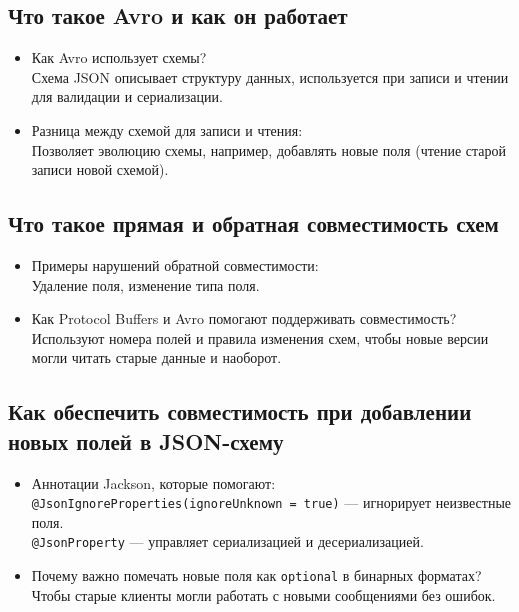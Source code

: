 \documentclass[a4paper,14pt]{article}
\begin{document}
\subsection{Что такое Avro и как он работает}

\begin{itemize}
\item Как Avro использует схемы? \\
Схема JSON описывает структуру данных, используется при записи и чтении для валидации и сериализации.

\item Разница между схемой для записи и чтения: \\
Позволяет эволюцию схемы, например, добавлять новые поля (чтение старой записи новой схемой).
\end{itemize}

\subsection{Что такое прямая и обратная совместимость схем}

\begin{itemize}
\item Примеры нарушений обратной совместимости: \\
Удаление поля, изменение типа поля.

\item Как Protocol Buffers и Avro помогают поддерживать совместимость? \\
Используют номера полей и правила изменения схем, чтобы новые версии могли читать старые данные и наоборот.
\end{itemize}

\subsection{Как обеспечить совместимость при добавлении новых полей в JSON-схему}

\begin{itemize}
\item Аннотации Jackson, которые помогают: \\
\texttt{@JsonIgnoreProperties(ignoreUnknown = true)} — игнорирует неизвестные поля. \\
\texttt{@JsonProperty} — управляет сериализацией и десериализацией.

\item Почему важно помечать новые поля как \texttt{optional} в бинарных форматах? \\
Чтобы старые клиенты могли работать с новыми сообщениями без ошибок.
\end{itemize}
\end{document}
